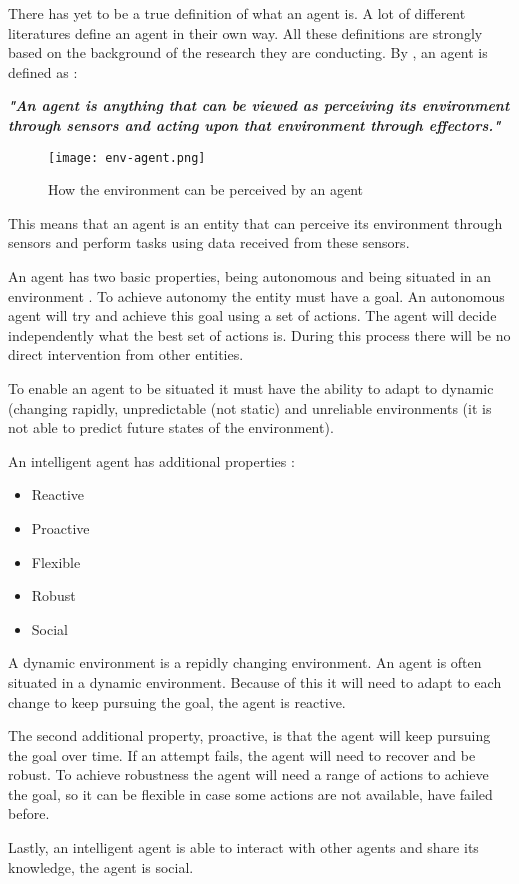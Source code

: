 
There has yet to be a true definition of what an agent is. A lot of different literatures define an agent in their own way.
All these definitions are strongly based on the background of the research they are conducting. By \citet{AI:agent}, an agent is defined as :

\begin{center}
    \textit{\textbf{"An agent is anything that can be viewed as perceiving its environment through sensors and acting upon that environment through effectors."}}
\end{center}


\begin{figure}[ht]
   \centering
   \texttt{[image: env-agent.png]}
   \caption[Agent]{How the environment can be perceived by an agent}
\end{figure}

This means that an agent is an entity that can perceive its environment through sensors and 
perform tasks using data received from these sensors. 

An agent has two basic properties, being autonomous and being situated in an environment \cite{AI:guide}. 
To achieve autonomy the entity must have a goal. An autonomous agent will try and achieve this goal using a set of actions. 
The agent will decide independently what the best set of actions is. During this process there will be no direct intervention from other entities.

To enable an agent to be situated it must have the ability to adapt to dynamic (changing rapidly, unpredictable (not static) 
and unreliable environments (it is not able to predict future states of the environment).

An intelligent agent has additional properties :

\begin{itemize}
   \item Reactive
   \item Proactive
   \item Flexible
   \item Robust
   \item Social
\end{itemize}

A dynamic environment is a repidly changing environment. An agent is often situated in a dynamic environment.
Because of this it will need to adapt to each change to keep pursuing the goal, the agent is reactive. 

The second additional property, proactive, is that the agent will keep pursuing the goal over time. 
If an attempt fails, the agent will need to recover and be robust. 
To achieve robustness the agent will need a range of actions to achieve 
the goal, so it can be flexible in case some actions are not available, have failed before. 

Lastly, an intelligent agent is able to interact with other agents and share its knowledge, the agent is social.